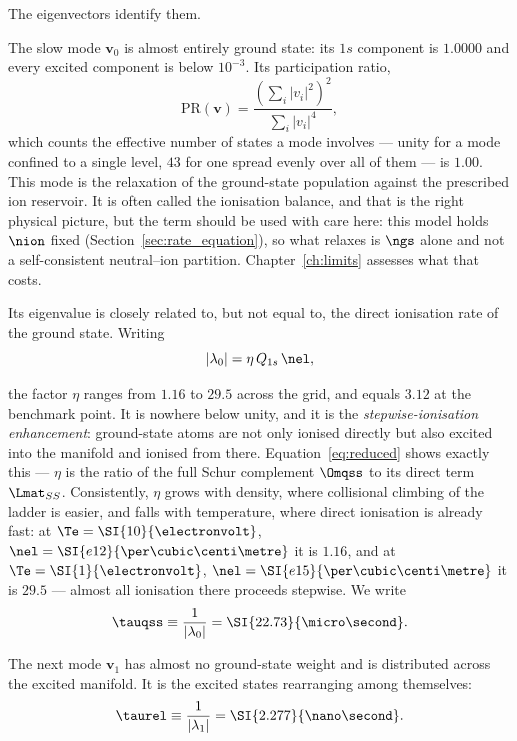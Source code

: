 The eigenvectors identify them.

The slow mode $\bm{v}_0$ is almost entirely ground state: its $1s$ component is
$1.0000$ and every excited component is below $10^{-3}$. Its participation ratio,
\begin{equation}
  \mathrm{PR}(\bm{v}) = \frac{\left(\sum_i |v_i|^2\right)^2}{\sum_i |v_i|^4},
  \label{eq:participation_ratio}
\end{equation}
which counts the effective number of states a mode involves --- unity for a mode
confined to a single level, $43$ for one spread evenly over all of them --- is
$1.00$. This mode is the relaxation of the
ground-state population against the prescribed ion reservoir. It is often
called the ionisation balance, and that is the right physical picture, but the
term should be used with care here: this model holds $\nion$ fixed
(Section~\ref{sec:rate_equation}), so what relaxes is $\ngs$ alone and not a
self-consistent neutral--ion partition. Chapter~\ref{ch:limits} assesses what
that costs.

Its eigenvalue is closely related to, but not equal to, the direct ionisation
rate of the ground state. Writing
\begin{equation}
  |\lambda_0| = \eta\,Q_{1s}\,\nel ,
  \label{eq:stepwise_enhancement}
\end{equation}

\noindent the factor $\eta$ ranges from $1.16$ to $29.5$ across the grid, and
equals $3.12$ at the benchmark point. It is nowhere below unity, and it is the
\emph{stepwise-ionisation enhancement}: ground-state atoms are not only ionised
directly but also excited into the manifold and ionised from there.
Equation~\eqref{eq:reduced} shows exactly this --- $\eta$ is the ratio of the
full Schur complement $\Omqss$ to its direct term $\Lmat_{SS}$. Consistently,
$\eta$ grows with density, where collisional climbing of the ladder is easier,
and falls with temperature, where direct ionisation is already fast: at
$\Te = \SI{10}{\electronvolt}$, $\nel = \SI{e12}{\per\cubic\centi\metre}$ it is
$1.16$, and at $\Te = \SI{1}{\electronvolt}$,
$\nel = \SI{e15}{\per\cubic\centi\metre}$ it is $29.5$ --- almost all ionisation
there proceeds stepwise. We write
\begin{equation}
  \tauqss \equiv \frac{1}{|\lambda_0|} = \SI{22.73}{\micro\second}.
\end{equation}

The next mode $\bm{v}_1$ has almost no ground-state weight and is distributed
across the excited manifold. It is the excited states rearranging among
themselves:
\begin{equation}
  \taurel \equiv \frac{1}{|\lambda_1|} = \SI{2.277}{\nano\second}.
\end{equation}

